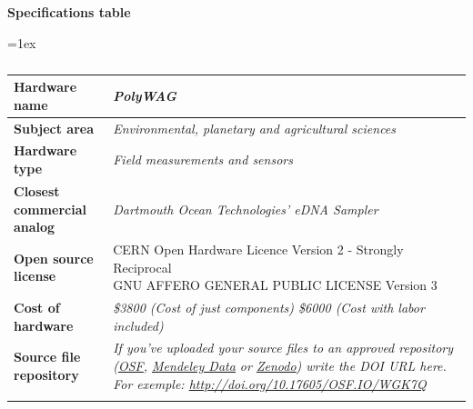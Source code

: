 \documentclass[11pt, letterpaper]{article}
\begin{document}
\begin{flushleft}
%
%
\newpage
\textbf{Specifications table}\\
\begin{table}[H]
\vskip 0.2cm
\tabulinesep=1ex
\begin{tabu} to \linewidth {|X[l]|X[3,l]|}
	\hline  
	\textbf{Hardware name} & 
	\textit{PolyWAG}
  	\\
  	\hline 
  	\textbf{Subject area} & 
  	\textit{Environmental, planetary and agricultural sciences}
  	\\
  	\hline 
  	\textbf{Hardware type} & 
  	\textit{Field measurements and sensors}
  	\\ 
	\hline 
	\textbf{Closest commercial analog} &
  	\textit{Dartmouth Ocean Technologies' eDNA Sampler}
  	\\
	\hline \textbf{Open source license} &
  	{CERN Open Hardware Licence Version 2 - Strongly Reciprocal \newline 
  		GNU AFFERO GENERAL PUBLIC LICENSE
                       Version 3}
  	\\
	\hline \textbf{Cost of hardware} &
  	\textit{\$3800 (Cost of just components)\newline
  		\$6000 (Cost with labor included)}
  	\\
	\hline \textbf{Source file repository} & 
  	\textit{If you’ve uploaded your source files to an approved repository (\href{http://osf.io}{\underline{OSF}}, \href{https://data.mendeley.com/}{\underline{Mendeley Data}} or \href{https://zenodo.org/}{\underline{Zenodo}}) write the DOI URL here. For exemple:  \href{http://doi.org/10.17605/OSF.IO/WGK7Q}{http://doi.org/10.17605/OSF.IO/WGK7Q}}  
  	\\
	\\\hline
\end{tabu}
\caption{}
\end{table}
\end{flushleft}
\end{document}
